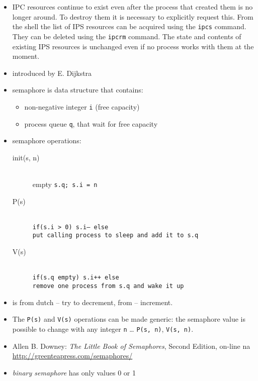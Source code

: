 \begin{itemize}
\item IPC resources continue to exist even after the process that created them
is no longer around. To destroy them it is necessary to explicitly request this.
From the shell the list of IPS resources can be acquired using 
the \texttt{ipcs} command. They can be deleted using the \texttt{ipcrm} command.
The state and contents of existing IPS resources is unchanged even if no process
works with them at the moment.
\end{itemize}


\begin{slide}
\begin{itemize}
\item introduced by E. Dijkstra
\item semaphore is data structure that contains:
    \begin{itemize}
    \item non-negative integer \texttt{i} (free capacity) 
    \item process queue \texttt{q}, that wait for free capacity
    \end{itemize}
\item semaphore operations: 
    \begin{description}
    \item [init(s, n)]~\\
    empty \texttt{s.q; s.i = n}
    \item [P(s)]~\\
    \texttt{if(s.i > 0) s.i-- else\\
    put calling process to sleep and add it to s.q }
    \item [V(s)]~\\
    \texttt{if(s.q empty) s.i++ else\\
    remove one process from s.q and wake it up}
    \end{description}
\end{itemize}
\end{slide}

\begin{itemize}
\item {} is from dutch  -- try to
decrement,  from  -- increment.
\item The \texttt{P(s)} and \texttt{V(s)} operations can be made generic:
the semaphore value is possible to change with any integer
\texttt{n} \dots{} \texttt{P(s,~n)}, \texttt{V(s,~n)}.
\item Allen B. Downey: \emph{The Little Book of Semaphores}, Second Edition,
on-line na \url{http://greenteapress.com/semaphores/}
\item \emph{binary semaphore} has only values 0 or 1
\end{itemize}

